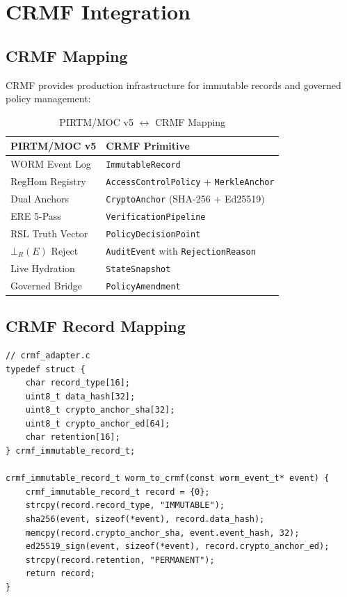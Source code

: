 \documentclass[11pt,a4paper]{article}
\begin{document}
\section{CRMF Integration}

\subsection{CRMF Mapping}

CRMF provides production infrastructure for immutable records and governed policy management:

\begin{table}[h]
\centering
\caption{PIRTM/MOC v5 $\leftrightarrow$ CRMF Mapping}
\label{tab:crmf_mapping}
\begin{tabular}{@{}l l@{}}
\toprule
\textbf{PIRTM/MOC v5} & \textbf{CRMF Primitive} \\
\midrule
WORM Event Log & \texttt{ImmutableRecord} \\
RegHom Registry & \texttt{AccessControlPolicy} + \texttt{MerkleAnchor} \\
Dual Anchors & \texttt{CryptoAnchor} (SHA-256 + Ed25519) \\
ERE 5-Pass & \texttt{VerificationPipeline} \\
RSL Truth Vector & \texttt{PolicyDecisionPoint} \\
$\bot_R(E)$ Reject & \texttt{AuditEvent} with \texttt{RejectionReason} \\
Live Hydration & \texttt{StateSnapshot} \\
Governed Bridge & \texttt{PolicyAmendment} \\
\bottomrule
\end{tabular}
\end{table}

\subsection{CRMF Record Mapping}

\begin{lstlisting}[caption={CRMF ImmutableRecord Mapping}, label=lst:crmf]
// crmf_adapter.c
typedef struct {
    char record_type[16];
    uint8_t data_hash[32];
    uint8_t crypto_anchor_sha[32];
    uint8_t crypto_anchor_ed[64];
    char retention[16];
} crmf_immutable_record_t;

crmf_immutable_record_t worm_to_crmf(const worm_event_t* event) {
    crmf_immutable_record_t record = {0};
    strcpy(record.record_type, "IMMUTABLE");
    sha256(event, sizeof(*event), record.data_hash);
    memcpy(record.crypto_anchor_sha, event.event_hash, 32);
    ed25519_sign(event, sizeof(*event), record.crypto_anchor_ed);
    strcpy(record.retention, "PERMANENT");
    return record;
}
\end{lstlisting}
\end{document}
